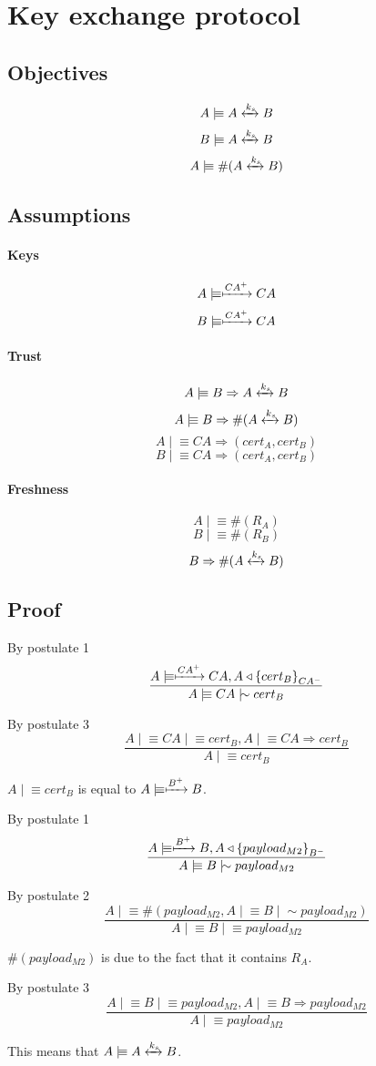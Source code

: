 \documentclass[a4paper,12pt]{article}
\newcommand{\believes}{\mid\!\equiv}
\newcommand{\sees}{\triangleleft}
\newcommand{\oncesaid}{\mid\!\sim}
\newcommand{\controls}{\Rightarrow}
\newcommand{\fresh}[1]{\#(#1)}
\newcommand{\encrypt}[2]{{ \{ #1 \} }_{#2}}
\newcommand{\sharekey}[1]{\xleftrightarrow{#1}}
\newcommand{\pubkey}[1]{\xmapsto{#1}}
\begin{document}
\section{Key exchange protocol}


\subsection{Objectives}

\[A \believes A \sharekey{k_s} B \]
\[B \believes A \sharekey{k_s} B \]
\[A \believes \fresh{A \sharekey{k_s} B} \]


\subsection{Assumptions}

\paragraph{Keys}

\[A \believes \pubkey{CA^+} CA \]
\[B \believes \pubkey{CA^+} CA \]

\paragraph{Trust}

\[A \believes B \controls A \sharekey{k_s} B \]
\[A \believes B \controls \fresh{A \sharekey{k_s} B} \]
\[A \believes CA \controls (cert_A, cert_B) \]
\[B \believes CA \controls (cert_A, cert_B) \]

\paragraph{Freshness}

\[A \believes \fresh{R_A} \]
\[B \believes \fresh{R_B} \]
\[B \controls \fresh{A \sharekey{k_s} B} \]

\subsection{Proof}

By postulate 1
\[\frac{A \believes \pubkey{CA^+} CA, A \sees \encrypt{cert_B}{CA^-}}{A \believes CA \oncesaid cert_B}\]

By postulate 3
\[\frac{A \believes CA \believes cert_B, A \believes CA \controls cert_B}{A \believes cert_B}\]

$A \believes cert_B$ is equal to $A \believes \pubkey{B^+} B$.

By postulate 1
\[\frac{A \believes \pubkey{B^+} B, A \sees \encrypt{payload_{M2}}{B^-}}{A \believes B \oncesaid payload_{M2}}\]

By postulate 2
\[\frac{A \believes \fresh{payload_{M2}, A \believes B \oncesaid payload_{M2}}}{A \believes B \believes payload_{M2}}\]

$\fresh{payload_{M2}}$ is due to the fact that it contains $R_A$.

By postulate 3
\[\frac{A \believes B \believes payload_{M2}, A \believes B \controls payload_{M2}}{A \believes payload_{M2}}\]

This means that $A \believes A \sharekey{k_s} B$.
\end{document}
